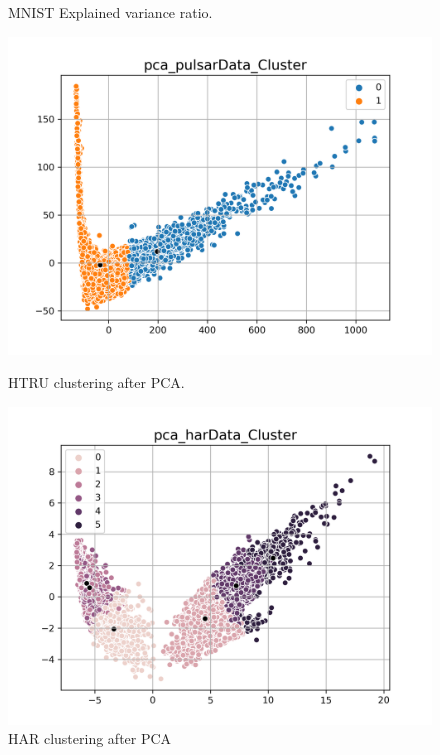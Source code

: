 \documentclass[journal]{IEEEtran}
\begin{document}
\begin{figure}[!htb]
    \caption{MNIST Explained variance ratio.}\label{fig_mnistpca}
  \endminipage
  \end{figure}

\begin{figure}[!htb]
    \includegraphics[width=\linewidth]{images/pca_pulsarData_Cluster.png}
    \caption{HTRU clustering after PCA.}\label{fig_pca_pulsarData_Cluster}
  \endminipage\hfill
    \includegraphics[width=\linewidth]{images/pca_harData_Cluster.png}
    \caption{HAR clustering after PCA}\label{fig_pca_harData_Cluster}
  \endminipage\hfill

\end{figure}
\end{document}

